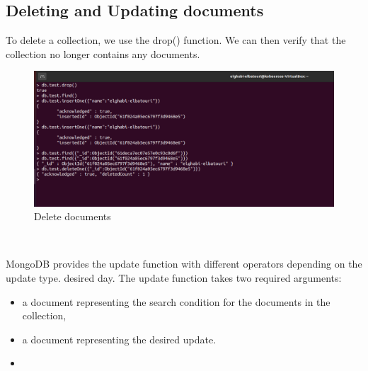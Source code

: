 \begin{spacing}{0.9}
\section{Deleting and Updating documents }
\par To delete a collection, we use the drop() function. We can then verify that the collection
no longer contains any documents.
\\
\begin{figure}[!htb] 
\begin{center} 
\includegraphics[width=1\linewidth]{Pictures/MongoDB/Examining MongoDB Query Features/Deleting and Updating documents/Delete documents} 
\end{center} 
\caption{Delete documents} 
\end{figure}  \FloatBarrier
\\
\newpage
\par MongoDB provides the update function with different operators depending on the update type.
desired day. The update function takes two required arguments:\\
\begin{itemize}
  \item a document representing the search condition for the documents in the collection,
  \item a document representing the desired update.
  \item
\end{itemize}


\end{spacing}
